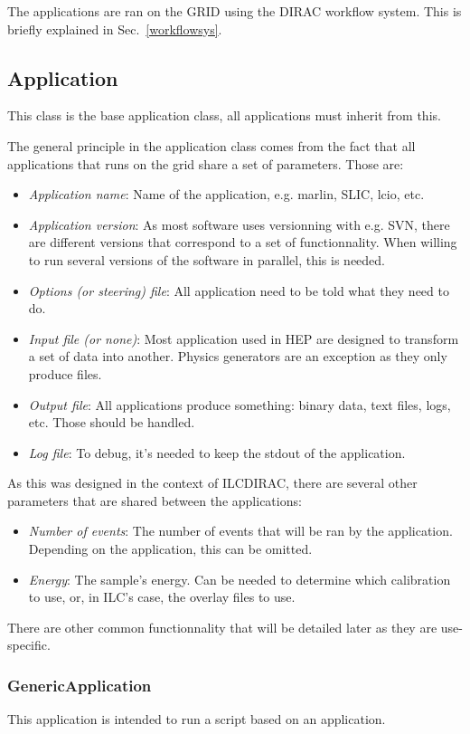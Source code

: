 \documentclass[a4paper,12pt]{article}
\begin{document}
The applications are ran on the GRID using the DIRAC workflow system. This is
briefly explained in Sec.~\ref{workflowsys}.

\subsection{Application}\label{application}
This class is the base application class, all applications must inherit from
this. 

The general principle in the application class comes from the fact that all
applications that runs on the grid share a set of parameters. Those are:
\begin{itemize}
  \item \emph{Application name}: Name of the application, e.g. marlin, SLIC,
  lcio, etc.
  \item \emph{Application version}: As most software uses versionning with e.g.
  SVN, there are different versions that correspond to a set of functionnality. When
  willing to run several versions of the software in parallel, this is needed.
  \item \emph{Options (or steering) file}: All application need to be told what
  they need to do. 
  \item \emph{Input file (or none)}: Most application used in HEP are designed
  to transform a set of data into another. Physics generators are an exception as
  they only produce files.
  \item \emph{Output file}: All applications produce something: binary data,
  text files, logs, etc. Those should be handled.
  \item \emph{Log file}: To debug, it's needed to keep the stdout of the
  application.
\end{itemize}
As this was designed in the context of ILCDIRAC, there are several other
parameters that are shared between the applications:
\begin{itemize}
  \item \emph{Number of events}: The number of events that will be ran by the
  application. Depending on the application, this can be omitted.
  \item \emph{Energy}: The sample's energy. Can be needed to determine which
  calibration to use, or, in ILC's case, the overlay files to use.
\end{itemize}
There are other common functionnality that will be detailed later as they are
use-specific.


\subsubsection{GenericApplication}\label{genericapp}
This application is intended to run a script based on an application. 
\end{document}
